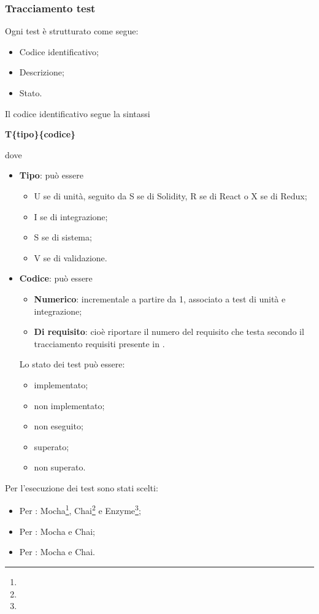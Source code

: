 \documentclass[NormeDiProgetto.tex]{subfiles}
\begin{document}
	\subsubsection{Tracciamento test}
	Ogni test è strutturato come segue:
	\begin{itemize}
		\item Codice identificativo;
		\item Descrizione;
		\item Stato.
	\end{itemize}
	Il codice identificativo segue la sintassi 
	\begin{center}
		\textbf{T\{tipo\}\{codice\}}
	\end{center}
dove 
\begin{itemize}
	\item \textbf{Tipo}: può essere 
	\begin{itemize}
		\item U se di unità, seguito da S se di Solidity, R se di React o X se di Redux;
		\item I se di integrazione;
		\item S se di sistema;
		\item V se di validazione.
	\end{itemize}
	\item \textbf{Codice}: può essere 
	\begin{itemize}
		\item \textbf{Numerico}: incrementale a partire da 1, associato a test di unità e integrazione;
		\item \textbf{Di requisito}: cioè riportare il numero del requisito che testa secondo il tracciamento requisiti presente in \adr \vrquattro.
	\end{itemize}

Lo stato dei test può essere:
\begin{itemize}
	\item implementato;
	\item non implementato;
	\item non eseguito;
	\item superato;
	\item non superato.
\end{itemize}
\end{itemize}
	Per l'esecuzione dei test sono stati scelti:
	\begin{itemize}
		\item Per : Mocha\footnote{}, Chai\footnote{} e Enzyme\footnote{};
		\item Per : Mocha e Chai;
		\item Per : Mocha e Chai.
	\end{itemize}
	
\end{document}
